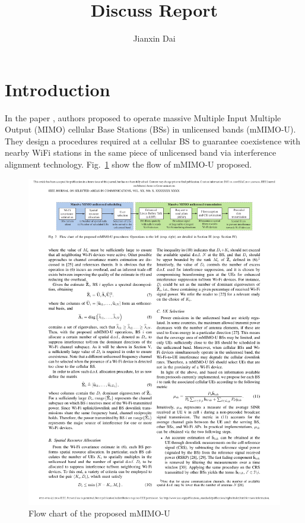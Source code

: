 \documentclass[12pt, onecolumn]{IEEEtran}
\author{Jianxin Dai\\
}
\title{Discuss Report }
\begin{document}
\maketitle


\section{Introduction}

In the paper \cite{geraci2017operating}, authors proposed to operate massive Multiple Input Multiple Output (MIMO) cellular Base Stations (BSs) in unlicensed bands (mMIMO-U). They design a procedures required at a cellular BS to guarantee coexistence with nearby WiFi stations in the same piece of unlicensed band via interference alignment technology.  Fig.~\ref{FIG:mMIMO} show the flow of mMIMO-U  proposed.
\begin{figure}[H]
    \centering\includegraphics[width=1\columnwidth]{mMIMO.pdf}
    \caption{ Flow chart of the proposed mMIMO-U}\label{FIG:mMIMO}
\end{figure}
\end{document}
